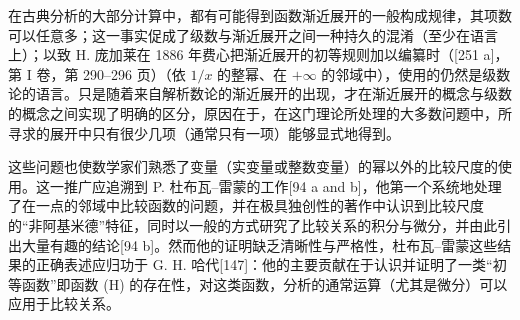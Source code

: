 在古典分析的大部分计算中，都有可能得到函数渐近展开的一般构成规律，其项数可以任意多；这一事实促成了级数与渐近展开之间一种持久的混淆（至少在语言上）；以致 H. 庞加莱在 1886 年费心把渐近展开的初等规则加以编纂时（{[}251 a{]}，第 I 卷，第 290–296 页）（依 \(1/x\) 的整幂、在 \(+\infty\) 的邻域中），使用的仍然是级数论的语言。只是随着来自解析数论的渐近展开的出现，才在渐近展开的概念与级数的概念之间实现了明确的区分，原因在于，在这门理论所处理的大多数问题中，所寻求的展开中只有很少几项（通常只有一项）能够显式地得到。

这些问题也使数学家们熟悉了变量（实变量或整数变量）的幂以外的比较尺度的使用。这一推广应追溯到 P. 杜布瓦–雷蒙的工作{[}94 a and b{]}，他第一个系统地处理了在一点的邻域中比较函数的问题，并在极具独创性的著作中认识到比较尺度的“非阿基米德”特征，同时以一般的方式研究了比较关系的积分与微分，并由此引出大量有趣的结论{[}94 b{]}。然而他的证明缺乏清晰性与严格性，杜布瓦–雷蒙这些结果的正确表述应归功于 G. H. 哈代{[}147{]}：他的主要贡献在于认识并证明了一类“初等函数”即函数 (H) 的存在性，对这类函数，分析的通常运算（尤其是微分）可以应用于比较关系。

